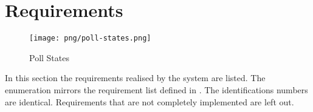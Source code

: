 \section{Requirements}
\label{requirements}

\begin{figure}
\centering
\texttt{[image: png/poll-states.png]}
\caption{Poll States}
\end{figure}

In this section the requirements realised by the system are listed. The enumeration mirrors the requirement list defined in \cite{Votes14}. The identifications numbers are identical. Requirements that are not completely implemented are left out.


